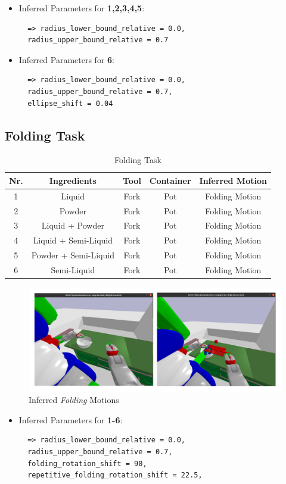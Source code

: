 \begin{itemize}
\item Inferred Parameters for \textbf{1,2,3,4,5}: 
 \begin{lstlisting}
  => radius_lower_bound_relative = 0.0, 
  radius_upper_bound_relative = 0.7
\end{lstlisting}
\item Inferred Parameters for \textbf{6}:
\begin{lstlisting}
  => radius_lower_bound_relative = 0.0, 
  radius_upper_bound_relative = 0.7,
  ellipse_shift = 0.04
\end{lstlisting}
\end{itemize}

\subsection*{Folding Task}
\begin{table}[H]
  \centering
  \begin{tabular}{|c|c|c|c|c|}
    \hline
    \textbf{Nr.} & \textbf{Ingredients} & \textbf{Tool} & \textbf{Container} & \textbf{Inferred Motion}  \\
    \hline
    1 & Liquid & Fork & Pot & Folding Motion \\
    \hline
    2 & Powder & Fork & Pot & Folding Motion \\
    \hline
    3 & Liquid + Powder & Fork & Pot & Folding Motion \\
    \hline
    4 & Liquid + Semi-Liquid & Fork & Pot & Folding Motion \\
    \hline
    5 & Powder + Semi-Liquid & Fork & Pot & Folding Motion \\
    \hline
    6 & Semi-Liquid & Fork & Pot & Folding Motion \\
    \hline
  \end{tabular}
  \caption{Folding Task}
  \label{tab:mixingtask}
\end{table}
\begin{figure}[H]
  \includegraphics[scale=0.25]{Graphics/folding_evaluation.jpg}
  \caption{Inferred \textit{Folding} Motions}
  \label{fig:mixingverb WikiHow}
\end{figure}
\begin{itemize}
\item Inferred Parameters for \textbf{1-6}: 
 \begin{lstlisting}
  => radius_lower_bound_relative = 0.0, 
  radius_upper_bound_relative = 0.7,
  folding_rotation_shift = 90, 
  repetitive_folding_rotation_shift = 22.5,
\end{lstlisting}
\end{itemize}